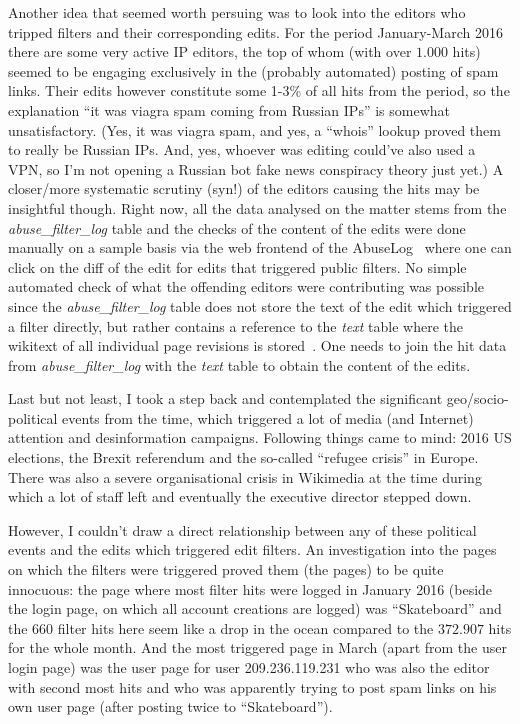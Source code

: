 Another idea that seemed worth persuing was to look into the editors who tripped filters and their corresponding edits.
For the period January-March 2016 there are some very active IP editors, the top of whom (with over $1.000$ hits) seemed to be engaging exclusively in the (probably automated) posting of spam links.
Their edits however constitute some 1-3\% of all hits from the period, so the explanation ``it was viagra spam coming from Russian IPs'' is somewhat unsatisfactory.
(Yes, it was viagra spam, and yes, a ``whois'' lookup proved them to really be Russian IPs.
And, yes, whoever was editing could've also used a VPN, so I'm not opening a Russian bot fake news conspiracy theory just yet.)
A closer/more systematic scrutiny (syn!) of the editors causing the hits may be insightful though.
Right now, all the data analysed on the matter stems from the \emph{abuse\_filter\_log} table and the checks of the content of the edits were done manually on a sample basis via the web frontend of the AbuseLog~\cite{Wikipedia:AbuseLog} where one can click on the diff of the edit for edits that triggered public filters.
No simple automated check of what the offending editors were contributing was possible since the \emph{abuse\_filter\_log} table does not store the text of the edit which triggered a filter directly, but rather contains a reference to the \emph{text} table where the wikitext of all individual page revisions is stored~\cite{Wikipedia:TextTable}.
One needs to join the hit data from \emph{abuse\_filter\_log} with the \emph{text} table to obtain the content of the edits.

Last but not least, I took a step back and contemplated the significant geo/socio-political events from the time, which triggered a lot of media (and Internet) attention and desinformation campaigns.
Following things came to mind: 2016 US elections, the Brexit referendum and the so-called ``refugee crisis'' in Europe.
There was also a severe organisational crisis in Wikimedia at the time during which a lot of staff left and eventually the executive director stepped down.

However, I couldn't draw a direct relationship between any of these political events and the edits which triggered edit filters.
An investigation into the pages on which the filters were triggered proved them (the pages) to be quite innocuous:
the page where most filter hits were logged in January 2016 (beside the login page, on which all account creations are logged) was ``Skateboard'' and the $660$ filter hits here seem like a drop in the ocean compared to the $372.907$ hits for the whole month.
And the most triggered page in March (apart from the user login page) was the user page for user 209.236.119.231 who was also the editor with second most hits and who was apparently trying to post spam links on his own user page (after posting twice to ``Skateboard'').

